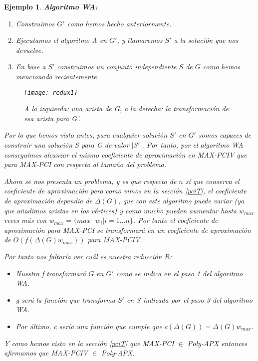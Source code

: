 \documentclass[a4paper,12pt,titlepage]{article}
\newtheorem{eje}{Ejemplo}[section]
\begin{document}
\begin{eje}
\vspace{0,3cm}

\textbf{Algoritmo WA:}

\begin{enumerate}
\item Construimos $G'$ como hemos hecho anteriormente.
\item Ejecutamos el algoritmo A en $G'$, y llamaremos $S'$ a la soluci\'on que nos devuelve.
\item En base a $S'$ construimos un conjunto independiente $S$ de $G$ como hemos mencionado recientemente.
\end{enumerate}

\begin{figure}[h]
\centering
\texttt{[image: redux1]}
\caption{A la izquierda: una arista de G, a la derecha: la transformaci\'on de esa arista para G'.}
\label{redux:fig:2}
\end{figure}

Por lo que hemos visto antes, para cualquier soluci\'on $S'$ en $G'$ somos capaces de construir una soluci\'on S para G de valor $|S'|$. Por tanto, por el algoritmo WA conseguimos alcanzar el mismo coeficiente de aproximaci\'on en MAX-PCIV que para MAX-PCI con respecto al tamaño del problema.

Ahora se nos presenta un problema, y es que respecto de $n$ s\'i que conserva el coeficiente de aproximaci\'on pero como vimos en la secci\'on \ref{pciT}, el coeficiente de aproximaci\'on depend\'ia de $\Delta(G)$, que con este algoritmo puede variar (ya que añadimos aristas en los v\'ertices) y como mucho pueden aumentar hasta $w_{max}$ veces m\'as con $w_{max}=\{max\text{ }w_i | i=1...n\}$. Por tanto el coeficiente de aproximaci\'on para MAX-PCI se transformar\'a en un coeficiente de aproximaci\'on de $O(f(\Delta(G)w_{max}))$ para MAX-PCIV.

Por tanto nos faltar\'ia ver cu\'al es nuestra reducci\'on R:

\begin{itemize}
\item Nuestra f transformar\'a $G$ en $G'$ como se indica en el paso 1 del algoritmo WA.
\item g ser\'a la funci\'on que transforma $S'$ en $S$ indicada por el paso 3 del algoritmo WA.
\item Por \'ultimo, c ser\'ia una funci\'on que cumple que $c(\Delta(G))=\Delta(G)w_{max}$.
\end{itemize}

Y como hemos visto en la secci\'on \ref{pciT} que MAX-PCI $\in$ Poly-APX entonces afirmamos que MAX-PCIV $\in$ Poly-APX.

\end{eje}
\end{document}
